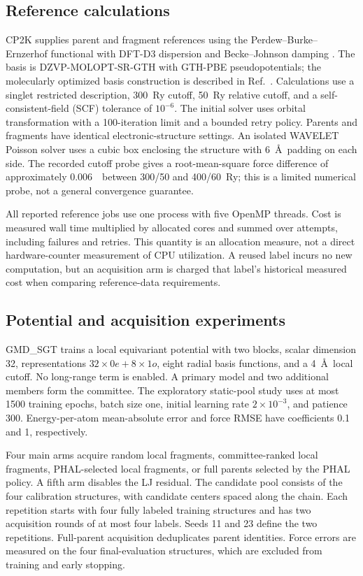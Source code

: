 \subsection{Reference calculations}
CP2K \citep{kuhne2020cp2k} supplies parent and fragment references using
the Perdew--Burke--Ernzerhof functional \citep{perdew1996pbe} with
DFT-D3 dispersion and Becke--Johnson damping
\citep{grimme2010d3,grimme2011d3bj}.
The basis is DZVP-MOLOPT-SR-GTH with GTH-PBE pseudopotentials;
the molecularly optimized basis construction is described in
Ref.~\citep{vandevondele2007molopt}.
Calculations use a singlet restricted description, 300~Ry cutoff,
50~Ry relative cutoff, and a self-consistent-field (SCF) tolerance
of $10^{-6}$. The initial solver uses orbital transformation with
a 100-iteration limit and a bounded retry policy.
Parents and fragments have identical electronic-structure settings.
An isolated WAVELET Poisson solver uses a cubic box enclosing the
structure with 6~\AA\ padding on each side.
The recorded cutoff probe gives a root-mean-square force difference of
approximately 0.006~\forceunit\ between 300/50 and 400/60~Ry; this is a limited
numerical probe, not a general convergence guarantee.

All reported reference jobs use one process with five OpenMP threads.
Cost is measured wall time multiplied by allocated cores and summed
over attempts, including failures and retries. This quantity is an
allocation measure, not a direct hardware-counter measurement of CPU
utilization. A reused label incurs no new computation, but an
acquisition arm is charged that label's historical measured cost
when comparing reference-data requirements.

\subsection{Potential and acquisition experiments}
GMD\_SGT trains a local equivariant potential with two blocks, scalar
dimension 32, representations $32\times0e+8\times1o$, eight radial
basis functions, and a 4~\AA\ local cutoff. No long-range term is enabled.
A primary model and two additional members form the committee.
The exploratory static-pool study uses at most 1500 training epochs,
batch size one, initial learning rate $2\times10^{-3}$, and patience
300. Energy-per-atom mean-absolute error and force RMSE have coefficients
0.1 and 1, respectively.

Four main arms acquire random local fragments, committee-ranked local
fragments, PHAL-selected local fragments, or full parents selected by
the PHAL policy. A fifth arm disables the LJ residual.
The candidate pool consists of the four calibration structures, with
candidate centers spaced along the chain. Each repetition starts with
four fully labeled training structures and has two acquisition rounds
of at most four labels. Seeds 11 and 23 define the two repetitions.
Full-parent acquisition deduplicates parent identities.
Force errors are measured on the four final-evaluation structures,
which are excluded from training and early stopping.

